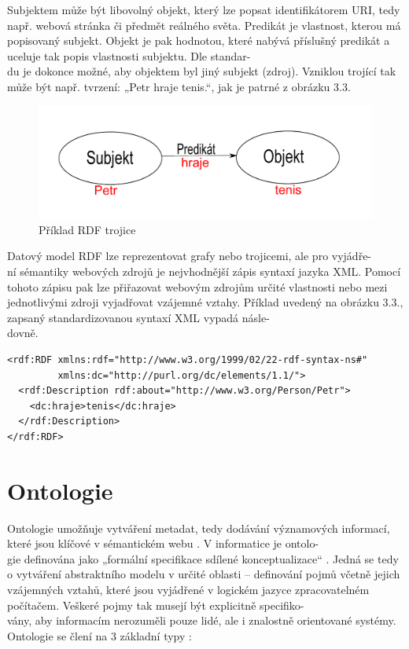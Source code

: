 \documentclass{projekt}
\begin{document}
Subjektem může být libovolný objekt, který lze popsat identifikátorem URI, tedy např. webová stránka či předmět reálného světa.
Predikát je vlastnost, kterou má popisovaný subjekt. Objekt je pak hodnotou, které nabývá příslušný predikát a uceluje tak popis vlastnosti subjektu. Dle standar-\\du \cite{ctyri} je dokonce možné, aby objektem byl jiný subjekt (zdroj).
\newpage
Vzniklou trojící tak může být např. tvrzení: „Petr hraje tenis.“, jak je patrné z obrázku 3.3.

\begin{figure}[htb]
\begin{center}
\includegraphics[scale=0.62]{trojice.pdf}
\caption{Příklad RDF trojice}
\end{center}
\end{figure}

Datový model RDF lze reprezentovat grafy nebo trojicemi, ale pro vyjádře-\\ní sémantiky webových zdrojů je nejvhodnější zápis syntaxí jazyka XML. Pomocí tohoto zápisu pak lze přiřazovat webovým zdrojům určité vlastnosti nebo mezi jednotlivými zdroji vyjadřovat vzájemné vztahy.
Příklad uvedený na obrázku 3.3., zapsaný standardizovanou syntaxí XML \cite{ctyri} vypadá násle-\\dovně.

\begin{verbatim}
<rdf:RDF xmlns:rdf="http://www.w3.org/1999/02/22-rdf-syntax-ns#"
         xmlns:dc="http://purl.org/dc/elements/1.1/">
  <rdf:Description rdf:about="http://www.w3.org/Person/Petr">
    <dc:hraje>tenis</dc:hraje>
  </rdf:Description>
</rdf:RDF>

\end{verbatim}


\section{Ontologie}

\hspace{0.65cm}Ontologie umožňuje vytváření metadat, tedy dodávání významových informací, které jsou klíčové v sémantickém webu \cite{sest}.
V informatice je ontolo-\\gie definována jako „formální specifikace sdílené konceptualizace“ \cite{pet}. Jedná se tedy o vytváření abstraktního modelu v určité oblasti – definování pojmů včetně jejich vzájemných vztahů, které jsou vyjádřené v logickém jazyce zpracovatelném počítačem. Veškeré pojmy tak musejí být explicitně specifiko-\\vány, aby informacím nerozuměli pouze lidé, ale i znalostně orientované systémy.\\
Ontologie se člení na 3 základní typy \cite{sest}:
\end{document}

